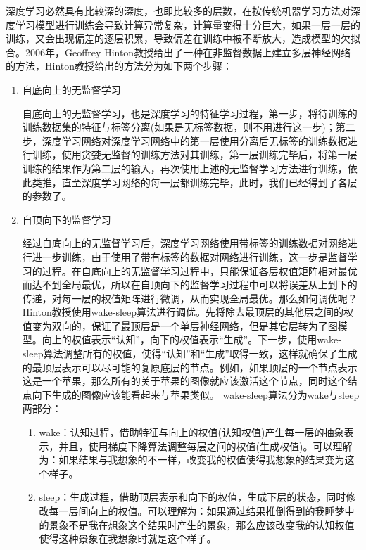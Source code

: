 深度学习必然具有比较深的深度，也即比较多的层数，在按传统机器学习方法对深度学习模型进行训练会导致计算异常复杂，计算量变得十分巨大，如果一层一层的训练，又会出现偏差的逐层积累，导致偏差在训练中被不断放大，造成模型的欠拟合。2006年，Geoffrey Hinton教授给出了一种在非监督数据上建立多层神经网络的方法，Hinton教授给出的方法分为如下两个步骤：
\begin{enumerate}
    \item 自底向上的无监督学习

    自底向上的无监督学习，也是深度学习的特征学习过程，第一步，将待训练的训练数据集的特征与标签分离(如果是无标签数据，则不用进行这一步)；第二步，深度学习网络对深度学习网络中的第一层使用分离后无标签的训练数据进行训练，使用贪婪无监督的训练方法对其训练，第一层训练完毕后，将第一层训练的结果作为第二层的输入，再次使用上述的无监督学习方法进行训练，依此类推，直至深度学习网络的每一层都训练完毕，此时，我们已经得到了各层的参数了。

    \item 自顶向下的监督学习

    经过自底向上的无监督学习后，深度学习网络使用带标签的训练数据对网络进行进一步训练，由于使用了带有标签的数据对网络进行训练，这一步是监督学习的过程。在自底向上的无监督学习过程中，只能保证各层权值矩阵相对最优而达不到全局最优，所以在自顶向下的监督学习过程中可以将误差从上到下的传递，对每一层的权值矩阵进行微调，从而实现全局最优。那么如何调优呢？Hinton教授使用wake-sleep算法进行调优。先将除去最顶层的其他层之间的权值变为双向的，保证了最顶层是一个单层神经网络，但是其它层转为了图模型。向上的权值表示“认知”，向下的权值表示“生成”。下一步，使用wake-sleep算法调整所有的权值，使得“认知”和“生成”取得一致，这样就确保了生成的最顶层表示可以尽可能的复原底层的节点。例如，如果顶层的一个节点表示这是一个苹果，那么所有的关于苹果的图像就应该激活这个节点，同时这个结点向下生成的图像应该能看起来与苹果类似。
    wake-sleep算法分为wake与sleep两部分：
    \begin{enumerate}
        \item wake：认知过程，借助特征与向上的权值(认知权值)产生每一层的抽象表示，并且，使用梯度下降算法调整每层之间的权值(生成权值)。可以理解为：如果结果与我想象的不一样，改变我的权值使得我想象的结果变为这个样子。
        \item sleep：生成过程，借助顶层表示和向下的权值，生成下层的状态，同时修改每一层间向上的权值。可以理解为：如果通过结果推倒得到的我睡梦中的景象不是我在想象这个结果时产生的景象，那么应该改变我的认知权值使得这种景象在我想象时就是这个样子。
    \end{enumerate}
\end{enumerate}

